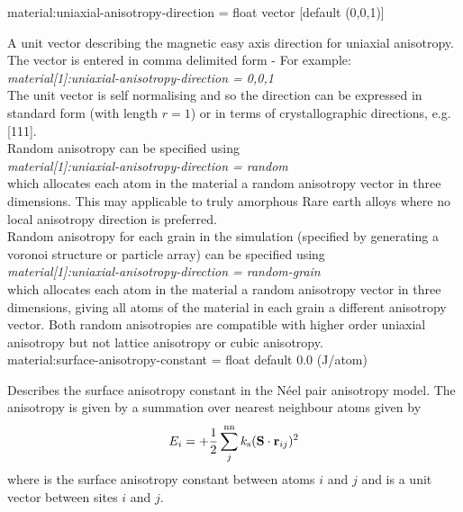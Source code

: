 {\zicf material:uniaxial-anisotropy-direction = float vector [default (0,0,1)]}
A unit vector \ei describing the magnetic easy axis direction for uniaxial
anisotropy. The vector is entered in comma delimited form - For example:\\

\textit{material[1]:uniaxial-anisotropy-direction = 0,0,1}\\

\noindent The unit vector is self normalising and so the direction can be
expressed in standard form (with length $r =  1$) or in terms of
crystallographic directions, e.g. [111].\\

Random anisotropy can be specified using\\

\textit{material[1]:uniaxial-anisotropy-direction = random}\\

which allocates each atom in the material a random anisotropy vector in three
dimensions. This may applicable to truly amorphous Rare earth alloys where no
local anisotropy direction is preferred.\\

Random anisotropy for each grain in the simulation (specified by generating a
voronoi structure or particle array) can be specified using\\

\textit{material[1]:uniaxial-anisotropy-direction = random-grain}\\

which allocates each atom in the material a random anisotropy vector in three
dimensions, giving all atoms of the material in each grain a different
anisotropy vector. Both random anisotropies are compatible with higher order
uniaxial anisotropy but not lattice anisotropy or cubic anisotropy.\\



{\zicf material:surface-anisotropy-constant = float default 0.0 (J/atom)}
Describes the surface anisotropy constant in the N\'eel pair anisotropy model.
The anisotropy is given by a summation over nearest neighbour atoms given by
\begin{equation*}
E_i = +\frac{1}{2} \sum_j^{\mathrm{nn}} k_{\mathrm{s}} (\mathbf{S} \cdot \mathbf{r}_{ij} )^2
\end{equation*}
where \ksurf is the surface anisotropy constant between atoms $i$ and $j$ and
\rij is a unit vector between sites $i$ and $j$.\\

